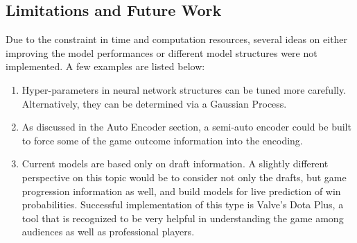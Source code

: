 \documentclass{article}
\begin{document}
\subsection{Limitations and Future Work}
Due to the constraint in time and computation resources, several ideas on either improving the model performances or different model structures were not implemented. A few examples are listed below:
\begin{enumerate}
    \item
    Hyper-parameters in neural network structures can be tuned more carefully. Alternatively, they can be determined via a Gaussian Process.
    \item
    As discussed in the Auto Encoder section, a semi-auto encoder could be built to force some of the game outcome information into the encoding. 
    \item
    Current models are based only on draft information. A slightly different perspective on this topic would be to consider not only the drafts, but game progression information as well, and build models for live prediction of win probabilities. Successful implementation of this type is Valve’s Dota Plus, a tool that is recognized to be very helpful in understanding the game among audiences as well as professional players.
\end{enumerate}

 \renewcommand{\thefootnote}{}




\end{document}

